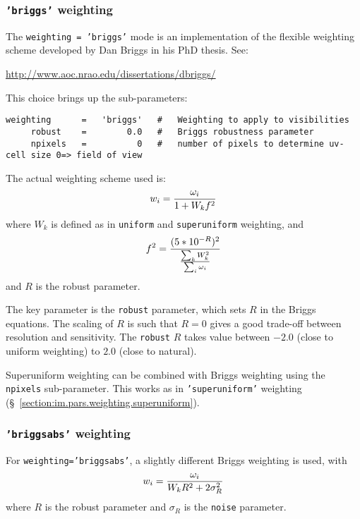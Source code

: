 \subsubsection{{\tt 'briggs'} weighting }
\label{section:im.pars.weighting.briggs}

The {\tt weighting = 'briggs'} mode is an implementation of the
flexible weighting scheme developed by Dan Briggs in his PhD thesis.
See:

\url{http://www.aoc.nrao.edu/dissertations/dbriggs/}

This choice brings up the sub-parameters:
\small
\begin{verbatim}
weighting      =   'briggs'   #   Weighting to apply to visibilities 
     robust    =        0.0   #   Briggs robustness parameter
     npixels   =          0   #   number of pixels to determine uv-cell size 0=> field of view
\end{verbatim}
\normalsize

The actual weighting scheme used is:
\begin{equation}
   w_i={\omega_i\over{1 + W_k f^2}}
\end{equation}
where $W_k$ is defined as in {\tt uniform} and {\tt superuniform}
weighting, and
\begin{equation}
   f^2={{(5*10^{-R})^2}\over{{\sum_k W_k^2}\over{\sum_i \omega_i}}}
\end{equation}
and $R$ is the robust parameter. 

The key parameter is the {\tt robust} parameter, which sets $R$ in the
Briggs equations.  The scaling of $R$ is such that $R = 0$ gives a
good trade-off between resolution and sensitivity. The {\tt robust}
$R$ takes value between $-2.0$ (close to uniform weighting) 
to $2.0$ (close to natural).

Superuniform weighting can be combined with Briggs weighting
using the {\tt npixels} sub-parameter.  This works as in 
{\tt 'superuniform'} weighting 
(\S~\ref{section:im.pars.weighting.superuniform}).

\subsubsection{{\tt 'briggsabs'} weighting }
\label{section:im.pars.weighting.briggsabs}

For {\tt weighting='briggsabs'}, a slightly different Briggs weighting is used,
with
\begin{equation}
  w_i={\omega_i\over{W_k R^2 + 2 \sigma_R^2}}
\end{equation}
where $R$ is the robust parameter and $\sigma_R$ is the {\tt noise}
parameter. 

